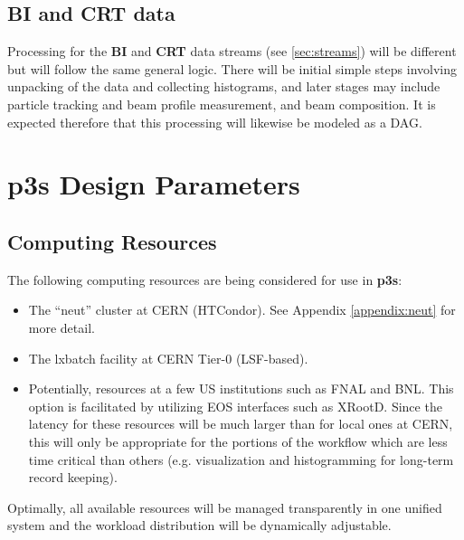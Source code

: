 \documentclass[pdftex,12pt,letter]{article}
\newcommand{\PPS}{\textbf{p3s}\xspace}
\begin{document}
\subsection{BI and CRT data}
Processing for the \textbf{BI} and \textbf{CRT} data streams (see \ref{sec:streams}) will be different but will
follow the same general logic. There will be initial simple steps involving unpacking of the data and collecting
histograms, and later stages may include particle tracking and beam profile measurement, and beam
composition. It is expected therefore that this processing will likewise be modeled as a DAG.


\section{\PPS Design Parameters}
\label{sec:parameters}

\subsection{Computing Resources}
\label{resources}
The following computing resources are being considered for use in \PPS:
\begin{itemize}

\item The ``neut'' cluster  \cite{neut} at CERN (HTCondor). See Appendix \ref{appendix:neut} for
more detail.

\item The lxbatch facility \cite{lxbatch} at CERN Tier-0 (LSF-based).

\item Potentially, resources at a few US institutions such as FNAL and BNL.  This option is facilitated
by utilizing EOS interfaces such as XRootD. Since the latency for these resources will be much larger
than for local ones at CERN, this will only be appropriate for the portions of the workflow which
are less time critical than others (e.g. visualization and histogramming for long-term record keeping).

\end{itemize}

\noindent Optimally, all available resources will be managed transparently in one unified system and
the workload distribution will be dynamically adjustable.
\end{document}
